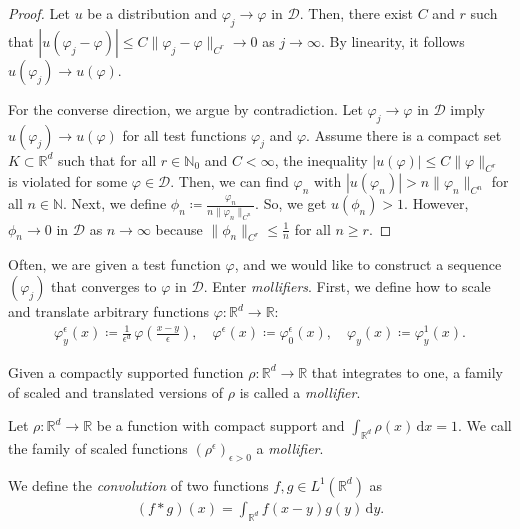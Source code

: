 \begin{proof}
    Let \(u\) be a distribution and \(\varphi_j \to \varphi \) in \(\mathcal{D}\). Then, there exist \(C\) and \(r\) such that \(|u(\varphi_j -\varphi)| \leq C \lVert \varphi_j - \varphi \rVert_{C^r} \to 0\) as \(j \to \infty \). By linearity, it follows \(u(\varphi_j) \to u(\varphi)\).

    For the converse direction, we argue by contradiction. Let \( \varphi_j \to \varphi \) in \(\mathcal{D}\) imply \(u(\varphi_j) \to u(\varphi)\) for all test functions \(\varphi_j\) and \(\varphi \). Assume there is a compact set \(K \subset \mathbb{R}^d\) such that for all \(r \in \mathbb{N}_0\) and \(C < \infty \), the inequality \(|u(\varphi)| \leq C \lVert\varphi\rVert_{C^r}\) is violated for some \(\varphi \in \mathcal{D}\). Then, we can find \(\varphi_n\) with \(|u(\varphi_n)| > n \lVert \varphi_n \rVert_{C^n}\) for all \(n \in \mathbb{N}\). Next, we define \(\phi_n \coloneqq \frac{\varphi_n}{n \lVert \varphi_n \rVert_{C^n}}\). So, we get \(u(\phi_n) > 1\). However, \(\phi_n \to 0\) in \(\mathcal{D}\) as \(n \to {\infty}\) because \(\lVert \phi_n \rVert_{C^r} \leq \frac{1}{n}\) for all \(n \geq r\).
\end{proof}

Often, we are given a test function \({\varphi}\), and we would like to construct a sequence 
\((\varphi_j)\) that converges to \( \varphi \) in \( \mathcal{D} \).
Enter \emph{mollifiers}. First, we define how to scale and translate arbitrary functions \(\varphi: \mathbb{R}^d \to \mathbb{R}\):
\begin{align*}
    \varphi^\epsilon_y(x) \coloneqq \frac{1}{\epsilon^d} \, \varphi\left(\frac{x-y}{\epsilon}\right), \quad \varphi^\epsilon(x) \coloneqq \varphi^\epsilon_0(x), \quad \varphi_y(x) \coloneqq \varphi^1_y(x).
\end{align*} 

Given a compactly supported function \(\rho: \mathbb{R}^d \to \mathbb{R}\) that integrates to one, a family of scaled and translated versions of \({\rho}\) is called a \emph{mollifier}.

\begin{definition}[Mollifier]
    Let \(\rho: \mathbb{R}^d \to \mathbb{R}\) be a function with compact support and \(\int_{\mathbb{R}^d} \rho(x) \, \mathrm{d}x = 1\). We call the family of scaled functions \({(\rho^\epsilon)}_{\epsilon > 0}\) a \emph{mollifier}.
\end{definition}

We define the \emph{convolution} of two functions \(f,g \in {L}^1(\mathbb{R}^d)\) as
\begin{align*}
    (f*g)(x) = \int_{\mathbb{R}^d} f(x - y)g(y) \, \mathrm{d}y.
\end{align*}

